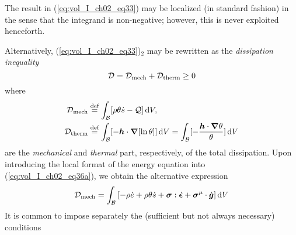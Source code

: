 \begin{remark} The result in (\ref{eq:vol_I_ch02_eq33}) may be localized 
(in standard fashion) in the
sense that the integrand is non-negative; however, 
this is never exploited henceforth.
\end{remark}

Alternatively, (\ref{eq:vol_I_ch02_eq33})$_2$ may be rewritten as the 
{\em dissipation inequality}
\begin{equation}
  \mathcal{D} = \mathcal{D}_{\mathrm{mech}} + \mathcal{D}_{\mathrm{therm}} \geq 0
 \label{eq:vol_I_ch02_eq35}
\end{equation}
where
\begin{subequations}\label{eq:vol_I_ch02_eq36}
\begin{align}
  \mathcal{D}_{\mathrm{mech}} & \stackrel{\text{def}}{=} \int_{\mathcal{B}} [\rho\theta\dot{s} - \mathcal{Q}] \mathop{}\!\mathrm{d} V ,
\label{eq:vol_I_ch02_eq36a} \\
  \mathcal{D}_{\mathrm{therm}} & \stackrel{\text{def}}{=} 
    \int_{\mathcal{B}}  [-{\bm h}       \cdot {\bm\nabla} [\ln\theta]] \mathop{}\!\mathrm{d} V
  = \int_{\mathcal{B}}  [-\frac{{\bm h} \cdot {\bm\nabla} \theta}{\theta}]  \mathop{}\!\mathrm{d} V
\label{eq:vol_I_ch02_eq36b}
\end{align}
\end{subequations}
are the {\em mechanical} and {\em thermal} part, respectively, of the total 
dissipation. Upon introducing the local
format of the energy equation into (\ref{eq:vol_I_ch02_eq36a}), we obtain 
the alternative expression
\begin{equation}
  \mathcal{D}_{\mathrm{mech}} = \int_{\mathcal{B}}  \left[-\rho \dot{e} + \rho \theta \dot{s} +
  \bm{\sigma}: \dot{\bm{\epsilon}} + \bm{\sigma}^{\mathrm{\mu}} \cdot \dot{\bm {g}} \right] \mathop{}\!\mathrm{d} V
 \label{eq:vol_I_ch02_eq37}
\end{equation}
It is common to impose separately the (sufficient but not always necessary) conditions
